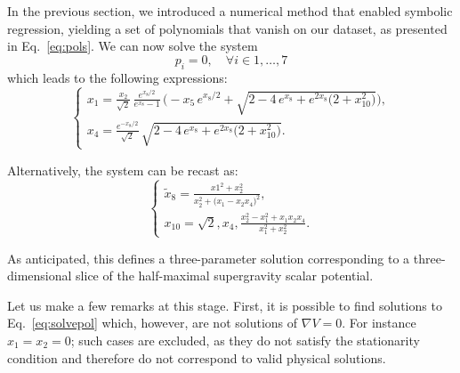 \documentclass[11pt]{article}
\newcommand{\ce}[1]{\marginpar{\parbox{\marginparwidth}{\boldmath $\Longleftarrow$}}{\boldmath\bfseries (ce: #1)}}
\begin{document}

In the previous section, we introduced a numerical method that enabled symbolic regression, yielding a set of polynomials that vanish on our dataset, as presented in Eq.~\ref{eq:pols}. We can now solve the system
\begin{equation}\label{eq:solvepol}
	p_i = 0, \quad \forall i \in {1,\dots,7}
\end{equation}
which leads to the following expressions:
\begin{equation}
	\begin{cases}
		\displaystyle x_{1} = \frac{x_{2}}{\sqrt{2}}\,\frac{e^{x_{8}/2}}{e^{x_{8}}-1}\,\Big(-x_{5}\,e^{x_{8}/2} + \sqrt{2-4\,e^{x_{8}}+e^{2x_{8}}\big(2+x_{10}^{2}\big)}\Big),\\[8pt]
		\displaystyle x_{4} = \frac{e^{-x_{8}/2}}{\sqrt{2}}\,\sqrt{2-4\,e^{x_{8}}+e^{2x_{8}}\big(2+x_{10}^{2}\big)}.
	\end{cases}
\end{equation}

Alternatively, the system can be recast as:
\begin{equation}\label{eq:rulex8x10}
	\begin{cases}
		\displaystyle \tilde{x}_{8} = \frac{x{1}^{2}+x_{2}^{2}}{x_{2}^{2} + \big(x_{1}-x_{2}x_{4}\big)^{2}},\\[10pt]
		\displaystyle x_{10} = \sqrt{2},x_{4},\frac{x_{2}^{2} - x_{1}^{2}+x_{1}x_{2}x_{4}}{x_{1}^{2}+x_{2}^{2}}.
	\end{cases}
\end{equation}

As anticipated, this defines a three-parameter solution corresponding to a three-dimensional slice of the half-maximal supergravity scalar potential.

Let us make a few remarks at this stage. First, it is possible to find solutions to Eq.~\ref{eq:solvepol} which, however, are not solutions of $\nabla V = 0$. For instance $x_1 = x_2 = 0$; such cases are excluded, as they do not satisfy the stationarity condition and therefore do not correspond to valid physical solutions.
\end{document}
